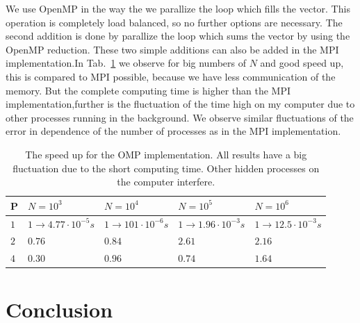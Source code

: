 We use OpenMP in the way the we parallize the loop which fills the vector. This operation is completely load balanced, so no further options are necessary. The second addition is done by parallize the loop which sums the vector by using the OpenMP reduction. These two simple additions can also be added in the MPI implementation.In Tab.~\ref{tab:speed_up1_omp} we observe for big numbers of $N$ and good speed up, this is compared to MPI possible, because we have less communication of the memory. But the complete computing time is higher than the MPI implementation,further is the fluctuation of the time high on my computer due to other processes running in the background. We observe similar fluctuations of the error in dependence of the number of processes as in the MPI implementation.
\begin{table}
\centering
    \begin{tabular}{| l | l | l | l | l |}
    
    \hline
    P & $N = 10^3$ & $N = 10^4$ & $N = 10^5$ & $N = 10^6$\\  \hline
	$1$ & $1 \rightarrow 4.77 \cdot 10^{-5} s$ & $1 \rightarrow 101 \cdot 10^{-6} s$ & $1 \rightarrow 1.96 \cdot 10^{-3} s$ & $1 \rightarrow 12.5 \cdot 10^{-3} s$\\    
    $2$ & $0.76$ & $0.84$ & $2.61$ &$2.16$ \\
    $4$ & $0.30$ & $0.96$ & $0.74$ &$1.64$ \\
    \hline
    
    \end{tabular}
    \caption{The speed up for the OMP implementation. All results have a big fluctuation due to the short computing time. Other hidden processes on the computer interfere.}
    \label{tab:speed_up1_omp}
\end{table}

\section{Conclusion}

